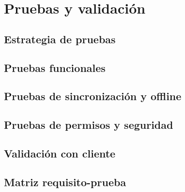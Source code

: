 \chapter{Pruebas y validación}

\section{Estrategia de pruebas}

\section{Pruebas funcionales}

\section{Pruebas de sincronización y offline}

\section{Pruebas de permisos y seguridad}

\section{Validación con cliente}

\section{Matriz requisito-prueba}
